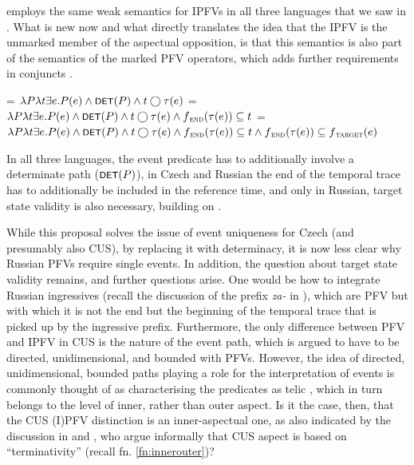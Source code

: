 \documentclass[output=paper,colorlinks,citecolor=brown]{langscibook}
\begin{document}
\citet{mueller23} employs the same weak semantics for IPFVs in all three languages that we saw in . What is new now and what directly translates the idea that the IPFV is the unmarked member of the aspectual opposition, is that this semantics is also part of the semantics of the marked PFV operators, which adds further requirements in conjuncts . 

\ea\label{ex:muellerpfvnew} 
\ea\label{ex:muellerpfvnewcus} 
 = $\lambda P \lambda t \exists e.P(e) \wedge \cnst{det}(P) \wedge t \bigcirc \tau(e)$
\ex\label{ex:muellerpfvnewcz} 
 = $\lambda P \lambda t \exists e.P(e) \wedge \cnst{det}(P) \wedge t \bigcirc \tau(e) \wedge f\textsubscript{\textsc{end}}(\tau(e)) \subseteq t$
\ex\label{ex:muellerpfvnewru}
 = $\lambda P \lambda t \exists e.P(e) \wedge \cnst{det}(P) \wedge t \bigcirc \tau(e) \wedge f\textsubscript{\textsc{end}}(\tau(e)) \subseteq t \wedge f\textsubscript{\textsc{end}}(\tau(e)) \subseteq f\textsubscript{\textsc{target}}(e)$
\z
\z 

\noindent In all three languages, the event predicate has to additionally involve a determinate path ($\cnst{det}(P)$), in Czech and Russian the end of the temporal trace has to additionally be included in the reference time, and only in Russian, target state validity is also necessary, building on \citet{Mueller-Reichau2018a}.  

While this proposal solves the issue of event uniqueness for Czech (and presumably also CUS), by replacing it with determinacy, it is now less clear why Russian PFVs require single events. In addition, the question about target state validity remains, and further questions arise. One would be how to integrate Russian ingressives (recall the discussion of the prefix \textit{za-} in ), which are PFV but with which it is not the end but the beginning of the temporal trace that is picked up by the ingressive prefix. Furthermore, the only difference between PFV and IPFV in CUS is the nature of the event path, which is argued to have to be directed, unidimensional, and bounded with PFVs. However, the idea of directed, unidimensional, bounded paths playing a role for the interpretation of events is commonly thought of as characterising the predicates as telic \citep[see, e.g.,][]{Krifka1998}, which in turn belongs to the level of inner, rather than outer aspect. Is it the case, then, that the CUS (I)PFV distinction is an inner-aspectual one, as also indicated by the discussion in \citet{breu00} and \citet{scholze08}, who argue informally that CUS aspect is based on ``terminativity'' (recall fn. \ref{fn:innerouter})? %
\end{document}
